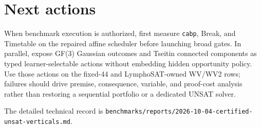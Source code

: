 \documentclass[11pt]{article}
\newcommand{\code}[1]{\texttt{#1}}
\begin{document}
\section*{Next actions}

When benchmark execution is authorized, first measure \code{cabp}, Break, and
Timetable on the repaired affine scheduler before launching broad gates. In
parallel, expose GF(3) Gaussian outcomes and Tseitin connected components as
typed learner-selectable actions without embedding hidden opportunity policy.
Use those actions on the fixed-44 and LymphoSAT-owned WV/WV2 rows; failures
should drive premise, consequence, variable, and proof-cost analysis rather than
restoring a sequential portfolio or a dedicated UNSAT solver.

The detailed technical record is
\code{benchmarks/reports/2026-10-04-certified-unsat-verticals.md}.
\end{document}
